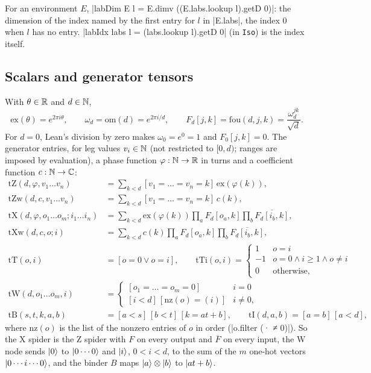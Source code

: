 \begin{definition}
For an environment $E$, \lean|labDim E l = E.dimv ((E.labs.lookup l).getD 0)|: the dimension of
the index named by the first entry for $l$ in \lean|E.labs|, the index $0$ when $l$ has no entry.
\lean|labIdx labs l = (labs.lookup l).getD 0| (in \texttt{Iso}) is the index itself.
\end{definition}

\subsection{Scalars and generator tensors}\label{sec:lean-core-net-tensors}

With $\theta\in\mathbb{R}$ and $d\in\mathbb{N}$,
\[
  \mathrm{ex}(\theta)=e^{2\pi i\theta},\qquad
  \omega_d=\mathrm{om}(d)=e^{2\pi i/d},\qquad
  F_d[j,k]=\mathrm{fou}(d,j,k)=\frac{\omega_d^{jk}}{\sqrt d}.
\]
For $d=0$, Lean's division by zero makes $\omega_0=e^{0}=1$ and $F_0[j,k]=0$. The generator
entries, for leg values $v_i\in\mathbb{N}$ (not restricted to $[0,d)$; ranges are imposed by evaluation), a
phase function $\varphi:\mathbb{N}\to\mathbb{R}$ in turns and a coefficient function $c:\mathbb{N}\to\mathbb{C}$:
\begin{align*}
\mathrm{tZ}(d,\varphi,v_1\dots v_n)&=\sum_{k<d}[v_1=\dots=v_n=k]\,\mathrm{ex}(\varphi(k)),\\
\mathrm{tZw}(d,c,v_1\dots v_n)&=\sum_{k<d}[v_1=\dots=v_n=k]\,c(k),\\
\mathrm{tX}(d,\varphi,o_1\dots o_m;i_1\dots i_n)&=\sum_{k<d}\mathrm{ex}(\varphi(k))
  \prod_{a}F_d[o_a,k]\prod_{b}\overline{F_d[i_b,k]},\\
\mathrm{tXw}(d,c,o;i)&=\sum_{k<d}c(k)\prod_{a}F_d[o_a,k]\prod_{b}\overline{F_d[i_b,k]},\\
\mathrm{tT}(o,i)&=[o=0\lor o=i],\qquad
\mathrm{tTi}(o,i)=\begin{cases}1&o=i\\-1&o=0\land i\ge 1\land o\ne i\\0&\text{otherwise,}\end{cases}\\
\mathrm{tW}(d,o_1\dots o_m,i)&=\begin{cases}[o_1=\dots=o_m=0]&i=0\\
  [i<d]\,[\mathrm{nz}(o)=(i)]&i\ne 0,\end{cases}\\
\mathrm{tB}(s,t,k,a,b)&=[a<s]\,[b<t]\,[k=at+b],\qquad
\mathrm{tI}(d,a,b)=[a=b]\,[a<d],
\end{align*}
where $\mathrm{nz}(o)$ is the list of the nonzero entries of $o$ in order (\lean|o.filter (· ≠ 0)|).
So the X spider is the Z spider with $F$ on every output and $\overline{F}$ on every input, the W
node sends $\lvert 0 \rangle$ to $\lvert 0\cdots0 \rangle$ and $\lvert i \rangle$, $0<i<d$, to the sum of the $m$ one-hot
vectors $\lvert 0\cdots i\cdots 0 \rangle$, and the binder $B$ maps $\lvert a \rangle\otimes\lvert b \rangle$ to $\lvert at+b \rangle$.

